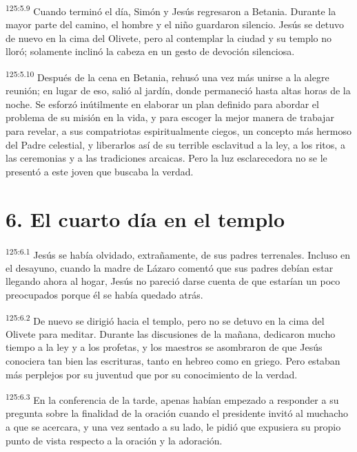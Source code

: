 \par
\textsuperscript{125:5.9} Cuando terminó el día, Simón y Jesús regresaron a Betania. Durante la mayor parte del camino, el hombre y el niño guardaron silencio. Jesús se detuvo de nuevo en la cima del Olivete, pero al contemplar la ciudad y su templo no lloró; solamente inclinó la cabeza en un gesto de devoción silenciosa.

\par
\textsuperscript{125:5.10} Después de la cena en Betania, rehusó una vez más unirse a la alegre reunión; en lugar de eso, salió al jardín, donde permaneció hasta altas horas de la noche. Se esforzó inútilmente en elaborar un plan definido para abordar el problema de su misión en la vida, y para escoger la mejor manera de trabajar para revelar, a sus compatriotas espiritualmente ciegos, un concepto más hermoso del Padre celestial, y liberarlos así de su terrible esclavitud a la ley, a los ritos, a las ceremonias y a las tradiciones arcaicas. Pero la luz esclarecedora no se le presentó a este joven que buscaba la verdad.

\section*{6. El cuarto día en el templo}
\par
\textsuperscript{125:6.1} Jesús se había olvidado, extrañamente, de sus padres terrenales. Incluso en el desayuno, cuando la madre de Lázaro comentó que sus padres debían estar llegando ahora al hogar, Jesús no pareció darse cuenta de que estarían un poco preocupados porque él se había quedado atrás.

\par
\textsuperscript{125:6.2} De nuevo se dirigió hacia el templo, pero no se detuvo en la cima del Olivete para meditar. Durante las discusiones de la mañana, dedicaron mucho tiempo a la ley y a los profetas, y los maestros se asombraron de que Jesús conociera tan bien las escrituras, tanto en hebreo como en griego. Pero estaban más perplejos por su juventud que por su conocimiento de la verdad.

\par
\textsuperscript{125:6.3} En la conferencia de la tarde, apenas habían empezado a responder a su pregunta sobre la finalidad de la oración cuando el presidente invitó al muchacho a que se acercara, y una vez sentado a su lado, le pidió que expusiera su propio punto de vista respecto a la oración y la adoración.

